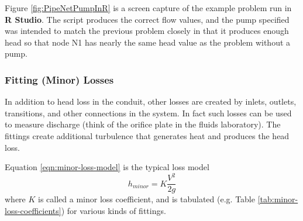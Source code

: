 Figure \ref{fig:PipeNetPumpInR} is a screen capture of the example problem run in \textbf{R Studio}.  
The script produces the correct flow values, and the pump specified was intended to match the previous problem closely in that it produces enough head so that node N1 has nearly the same head value as the problem without a pump.

\subsubsection{Fitting (Minor) Losses}
In addition to head loss in the conduit, other losses are created by inlets, outlets, transitions, and other connections in the system.   In fact such losses can be used to measure discharge (think of the orifice plate in the fluids laboratory).  The fittings create additional turbulence that generates heat and produces the head loss.

Equation \ref{eqn:minor-loss-model} is the typical loss model
\begin{equation}
h_{minor} = K \frac{V^2}{2g}
\label{eqn:minor-loss-model}
\end{equation}
where $K$ is called a minor loss coefficient, and is tabulated (e.g. Table \ref{tab:minor-loss-coefficients}) for various kinds of fittings.

